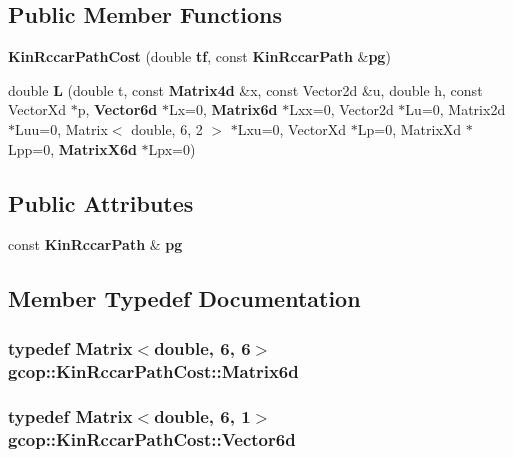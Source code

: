 \subsection*{\-Public \-Member \-Functions}
\begin{DoxyCompactItemize}
\item 
{\bf \-Kin\-Rccar\-Path\-Cost} (double {\bf tf}, const {\bf \-Kin\-Rccar\-Path} \&{\bf pg})
\item 
double {\bf \-L} (double t, const {\bf \-Matrix4d} \&x, const \-Vector2d \&u, double h, const \-Vector\-Xd $\ast$p, {\bf \-Vector6d} $\ast$\-Lx=0, {\bf \-Matrix6d} $\ast$\-Lxx=0, \-Vector2d $\ast$\-Lu=0, \-Matrix2d $\ast$\-Luu=0, \-Matrix$<$ double, 6, 2 $>$ $\ast$\-Lxu=0, \-Vector\-Xd $\ast$\-Lp=0, \-Matrix\-Xd $\ast$\-Lpp=0, {\bf \-Matrix\-X6d} $\ast$\-Lpx=0)
\end{DoxyCompactItemize}
\subsection*{\-Public \-Attributes}
\begin{DoxyCompactItemize}
\item 
const {\bf \-Kin\-Rccar\-Path} \& {\bf pg}
\end{DoxyCompactItemize}


\subsection{\-Member \-Typedef \-Documentation}
\subsubsection[{\-Matrix6d}]{\setlength{\rightskip}{0pt plus 5cm}typedef \-Matrix$<$double, 6, 6$>$ {\bf gcop\-::\-Kin\-Rccar\-Path\-Cost\-::\-Matrix6d}}\label{classgcop_1_1KinRccarPathCost_a3e587d227b1f4abafcad0cba4332a700}
\subsubsection[{\-Vector6d}]{\setlength{\rightskip}{0pt plus 5cm}typedef \-Matrix$<$double, 6, 1$>$ {\bf gcop\-::\-Kin\-Rccar\-Path\-Cost\-::\-Vector6d}}\label{classgcop_1_1KinRccarPathCost_ae737d9d24671ce85a189f262f8e33b2e}


